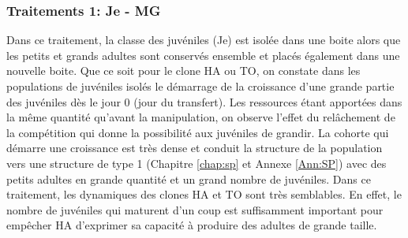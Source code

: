 \subsubsection{Traitements 1: Je - MG}

Dans ce traitement, la classe des juvéniles (Je) est isolée dans une boite alors
que les petits et grands adultes sont conservés ensemble et placés également
dans une nouvelle boite. Que ce soit pour le clone HA ou TO, on constate dans
les populations de juvéniles isolés le démarrage de la croissance d'une grande
partie des juvéniles dès le jour 0 (jour du transfert). Les ressources étant
apportées dans la même quantité qu'avant la manipulation, on observe l'effet du
relâchement de la compétition qui donne la possibilité aux juvéniles de grandir.
La cohorte qui démarre une croissance est très dense et conduit la structure de
la population vers une structure de type 1 (Chapitre \ref{chap:sp} et Annexe
\ref{Ann:SP}) avec des petits adultes en grande quantité et un grand nombre de
juvéniles. Dans ce traitement, les dynamiques des clones HA et TO sont très
semblables. En effet, le nombre de juvéniles qui maturent d'un coup est
suffisamment important pour empêcher HA d'exprimer sa capacité à produire des
adultes de grande taille.

